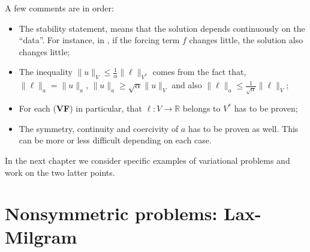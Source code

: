 A few comments are in order:

\begin{itemize}

\item The stability statement, means that the solution depends continuously on the ``data''.
For instance, in , if the forcing term $f$ changes little, the solution
also changes little; \\

\item The inequality $\lVert u \rVert_V \le \frac{1}{\alpha} \lVert \ell \rVert_{V^{*}}$
comes from the fact that, $\lVert \ell \rVert_a = \lVert u \rVert_a$,
$\lVert u \rVert_a \ge \sqrt{\alpha} \lVert u \rVert_V$ and also
$\lVert \ell \rVert_a \le \frac{1}{\sqrt{\alpha}} \lVert \ell \rVert_V$; \\

\item For each (\textbf{VF}) in particular, that $\ell: V\rightarrow \mathbb{R}$ belongs
to $V^{*}$ has to be proven;\\

\item The symmetry, continuity and coercivity of $a$ has to be proven as well.
This can be more or less difficult depending on each case.\\

\end{itemize}

In the next chapter we consider specific examples of variational problems
and work on the two latter points.

\section{Nonsymmetric problems: Lax-Milgram}


